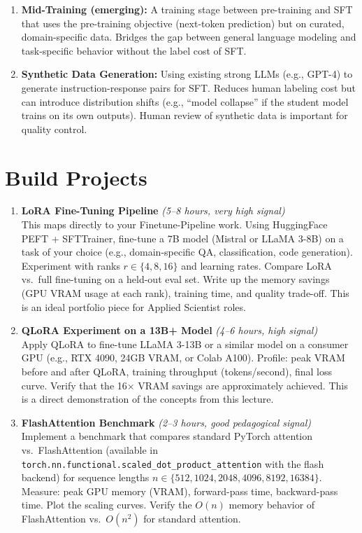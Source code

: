 \documentclass[11pt, a4paper]{article}
\begin{document}
\begin{enumerate}[leftmargin=2em]
  \item \textbf{Mid-Training (emerging):} A training stage between pre-training and SFT that uses the pre-training objective (next-token prediction) but on curated, domain-specific data. Bridges the gap between general language modeling and task-specific behavior without the label cost of SFT.

  \item \textbf{Synthetic Data Generation:} Using existing strong LLMs (e.g., GPT-4) to generate instruction-response pairs for SFT. Reduces human labeling cost but can introduce distribution shifts (e.g., ``model collapse'' if the student model trains on its own outputs). Human review of synthetic data is important for quality control.
\end{enumerate}

\newpage
\section{Build Projects}

\begin{enumerate}[leftmargin=2em]
  \item \textbf{LoRA Fine-Tuning Pipeline} \textit{(5--8 hours, very high signal)}\\
  This maps directly to your Finetune-Pipeline work. Using HuggingFace PEFT + SFTTrainer, fine-tune a 7B model (Mistral or LLaMA 3-8B) on a task of your choice (e.g., domain-specific QA, classification, code generation). Experiment with ranks $r \in \{4, 8, 16\}$ and learning rates. Compare LoRA vs.\ full fine-tuning on a held-out eval set. Write up the memory savings (GPU VRAM usage at each rank), training time, and quality trade-off. This is an ideal portfolio piece for Applied Scientist roles.

  \item \textbf{QLoRA Experiment on a 13B+ Model} \textit{(4--6 hours, high signal)}\\
  Apply QLoRA to fine-tune LLaMA 3-13B or a similar model on a consumer GPU (e.g., RTX 4090, 24GB VRAM, or Colab A100). Profile: peak VRAM before and after QLoRA, training throughput (tokens/second), final loss curve. Verify that the 16$\times$ VRAM savings are approximately achieved. This is a direct demonstration of the concepts from this lecture.

  \item \textbf{FlashAttention Benchmark} \textit{(2--3 hours, good pedagogical signal)}\\
  Implement a benchmark that compares standard PyTorch attention vs.\ FlashAttention (available in \texttt{torch.nn.functional.scaled\_dot\_product\_attention} with the flash backend) for sequence lengths $n \in \{512, 1024, 2048, 4096, 8192, 16384\}$. Measure: peak GPU memory (VRAM), forward-pass time, backward-pass time. Plot the scaling curves. Verify the $O(n)$ memory behavior of FlashAttention vs.\ $O(n^2)$ for standard attention.
\end{enumerate}
\end{document}
